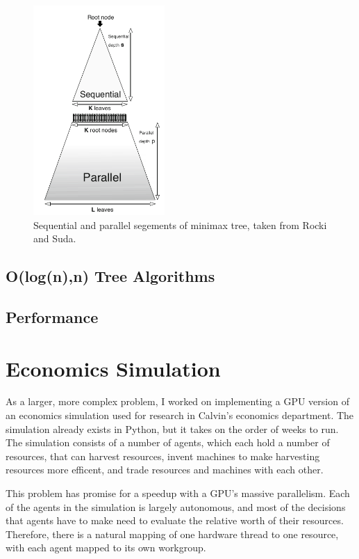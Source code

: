 \documentclass{article}
\begin{document}
\begin{figure}[ht!]
\centering
\includegraphics[width=50mm]{minimax-diagram.png}
\caption{Sequential and parallel segements of minimax tree, taken from Rocki and Suda\cite{rockisuda10}.}
\label{fig:minimaxdiagram}
\end{figure}

\subsection{O(log(n),n) Tree Algorithms}

\subsection{Performance}


\section{Economics Simulation}
As a larger, more complex problem, I worked on implementing a GPU version of an economics simulation used for research in Calvin's economics department.\cite{ditta13} The simulation already exists in Python, but it takes on the order of weeks to run. The simulation consists of a number of agents, which each hold a number of resources, that can harvest resources, invent machines to make harvesting resources more efficent, and trade resources and machines with each other.

This problem has promise for a speedup with a GPU's massive parallelism. Each of the agents in the simulation is largely autonomous, and most of the decisions that agents have to make need to evaluate the relative worth of their resources. Therefore, there is a natural mapping of one hardware thread to one resource, with each agent mapped to its own workgroup.
\end{document}
